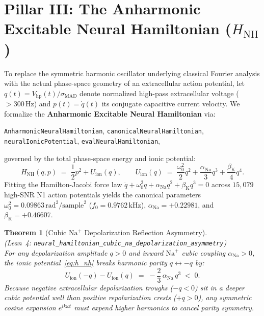 \documentclass[11pt,letterpaper]{article}
\newcommand{\lean}[1]{\nolinkurl{#1}}
\newtheorem{theorem}{Theorem}[section]
\theoremstyle{definition}
\begin{document}
\section{Pillar III: The Anharmonic Excitable Neural Hamiltonian ($H_{\mathrm{NH}}$)}

To replace the symmetric harmonic oscillator underlying classical Fourier analysis with the actual phase-space geometry of an extracellular action potential, let $q(t) = V_{\mathrm{hp}}(t)/\sigma_{\mathrm{MAD}}$ denote normalized high-pass extracellular voltage ($>300\,\text{Hz}$) and $p(t) = \dot{q}(t)$ its conjugate capacitive current velocity. We formalize the \textbf{Anharmonic Excitable Neural Hamiltonian} via:
\begin{center}
\footnotesize
\lean{AnharmonicNeuralHamiltonian}, \quad \lean{canonicalNeuralHamiltonian}, \quad \lean{neuralIonicPotential}, \quad \lean{evalNeuralHamiltonian},
\end{center}
governed by the total phase-space energy and ionic potential:
\begin{equation}
\label{eq:h_nh}
H_{\mathrm{NH}}(q, p) \;=\; \frac{1}{2}p^2 + U_{\mathrm{ion}}(q),
\qquad
U_{\mathrm{ion}}(q) \;=\; \frac{\omega_0^2}{2}q^2 + \frac{\alpha_{\mathrm{Na}}}{3}q^3 + \frac{\beta_{\mathrm{K}}}{4}q^4.
\end{equation}
Fitting the Hamilton-Jacobi force law $\ddot{q} + \omega_0^2 q + \alpha_{\mathrm{Na}}q^2 + \beta_{\mathrm{K}}q^3 = 0$ across $15{,}079$ high-SNR N1 action potentials yields the canonical parameters $\omega_0^2 = 0.09863\,\text{rad}^2/\text{sample}^2$ ($f_0 = 0.9762\,\text{kHz}$), $\alpha_{\mathrm{Na}} = +0.22981$, and $\beta_{\mathrm{K}} = +0.46607$.

\begin{theorem}[Cubic $\mathrm{Na}^+$ Depolarization Reflection Asymmetry]
\label{thm:t7}
~\\
(\emph{Lean~4:} \lean{neural_hamiltonian_cubic_na_depolarization_asymmetry})\\
For any depolarization amplitude $q > 0$ and inward $\mathrm{Na}^+$ cubic coupling $\alpha_{\mathrm{Na}} > 0$, the ionic potential~\eqref{eq:h_nh} breaks harmonic parity $q \leftrightarrow -q$ by:
\begin{equation}
\label{eq:t7_asymmetry}
U_{\mathrm{ion}}(-q) - U_{\mathrm{ion}}(q) \;=\; -\frac{2}{3}\,\alpha_{\mathrm{Na}}\,q^3 \;<\; 0.
\end{equation}
Because negative extracellular depolarization troughs ($-q < 0$) sit in a deeper cubic potential well than positive repolarization crests ($+q > 0$), any symmetric cosine expansion $e^{ik\omega t}$ must expend higher harmonics to cancel parity symmetry.
\end{theorem}
\end{document}
